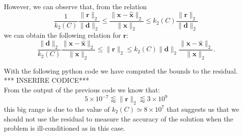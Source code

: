 \documentclass[a4paper,11pt]{article}
\begin{document}
\noindent However, we can observe that, from the relation
\begin{equation}\label{key}
	\frac{1}{k_2(C)} \frac{\lVert  \textbf{r}  \rVert_2 }{\lVert  \textbf{d}  \rVert_2 } \le \frac{\lVert  \textbf{x} - \hat{\textbf{x}} \rVert_2 }{\lVert  \textbf{x} \rVert_2 } \le k_2(C) \frac{\lVert  \textbf{r}  \rVert_2 }{\lVert  \textbf{d}  \rVert_2 }
\end{equation}
we can obtain the following relation for $\textbf{r} $:
\begin{equation}\label{key}
	\frac{\lVert  \textbf{d}  \rVert_2}{k_2(C)} \frac{\lVert  \textbf{x} - \hat{\textbf{x}} \rVert_2 }{\lVert  \textbf{x} \rVert_2 }\le \lVert  \textbf{r}  \rVert_2 \le k_2(C) \lVert  \textbf{d}  \rVert_2 \frac{\lVert  \textbf{x} - \hat{\textbf{x}} \rVert_2 }{\lVert  \textbf{x} \rVert_2 }.
\end{equation}

\noindent With the following python code we have computed the bounds to the residual.
*** INSERIRE CODICE***\\

\noindent From the output of the previous code we know that:
\begin{equation}\label{key}
	5 \times 10^{-7} \lessapprox \lVert  \textbf{r}  \rVert_2 \lessapprox 3 \times 10^9
\end{equation}
this big range is due to the value of $k_2(C)  \simeq 8 \times 10^7$ that suggests us that we should not use the residual to measure the accuracy of the solution when the problem is ill-conditioned as in this case. 
\end{document}
